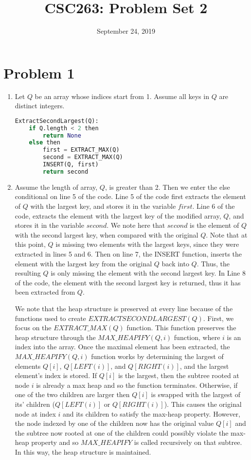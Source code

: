 \documentclass{article}
\title{CSC263: Problem Set 2}
\date{September 24, 2019}
\begin{document}
\maketitle

\section{Problem 1}

\begin{enumerate}[label=(\alph*)]

\item Let $Q$ be an array whose indices start from 1. Assume all keys in $Q$ are distinct integers.


\begin{lstlisting}[language=Python]
ExtractSecondLargest(Q):
    if Q.length < 2 then
        return None
    else then
        first = EXTRACT_MAX(Q)
        second = EXTRACT_MAX(Q)
        INSERT(Q, first)
        return second
\end{lstlisting}

\item Assume the length of array, $Q$, is greater than 2. Then we enter the else conditional on line 5 of the code. Line 5 of the code first extracts the element of $Q$ with the largest key, and stores it in the variable $first$. Line 6 of the code, extracts the element with the largest key of the modified array, $Q$, and stores it in the variable $second$. We note here that $second$ is the element of $Q$ with the second largest key, when compared with the original $Q$. Note that at this point, $Q$ is missing two elements with the largest keys, since they were extracted in lines 5 and 6. Then on line 7, the INSERT function, inserts the element with the largest key from the original $Q$ back into $Q$. Thus, the resulting $Q$ is only missing the element with the second largest key. In Line 8 of the code, the element with the second largest key is returned, thus it has been extracted from $Q$.

We note that the heap structure is preserved at every line because of the functions used to create $EXTRACTSECONDLARGEST(Q)$. First, we focus on the $EXTRACT\_MAX(Q)$ function. This function preserves the heap structure through the $MAX\_HEAPIFY(Q,i)$ function, where $i$ is an index into the array. Once the maximal element has been extracted, the $MAX\_HEAPIFY(Q,i)$ function works by determining the largest of elements $Q[i]$, $Q[LEFT(i)]$, and $Q[RIGHT(i)]$, and the largest element's index is stored. If $Q[i]$ is the largest, then the subtree rooted at node $i$ is already a max heap and so the function terminates. Otherwise, if one of the two children are larger then $Q[i]$ is swapped with the largest of its' children ($Q[LEFT(i)]$ or $Q[RIGHT(i)]$). This causes the original node at index $i$ and its children to satisfy the max-heap property. However, the node indexed by one of the children now has the original value $Q[i]$ and the subtree now rooted at one of the children could possibly violate the max-heap property and so $MAX\_HEAPIFY$ is called recursively on that subtree. In this way, the heap structure is maintained.    


\end{enumerate}
\end{document}
